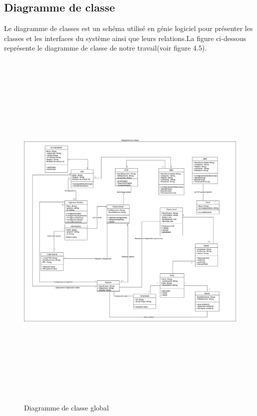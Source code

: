 \subsection{\selectfont\Large Diagramme de classe}
 Le diagramme de classes est un schéma utilisé en génie logiciel pour présenter les classes et les interfaces du système ainsi que leurs relations.La figure ci-dessous représente le 
diagramme de classe de notre travail(voir figure 4.5)\cite{13}.
\begin{figure}[H]
  \begin{center}
  
      \includegraphics[width=18cm,height=18cm]{ClassDiagram.drawio.png}

  \end{center}
  
  \caption{Diagramme de classe global}
\end{figure}
